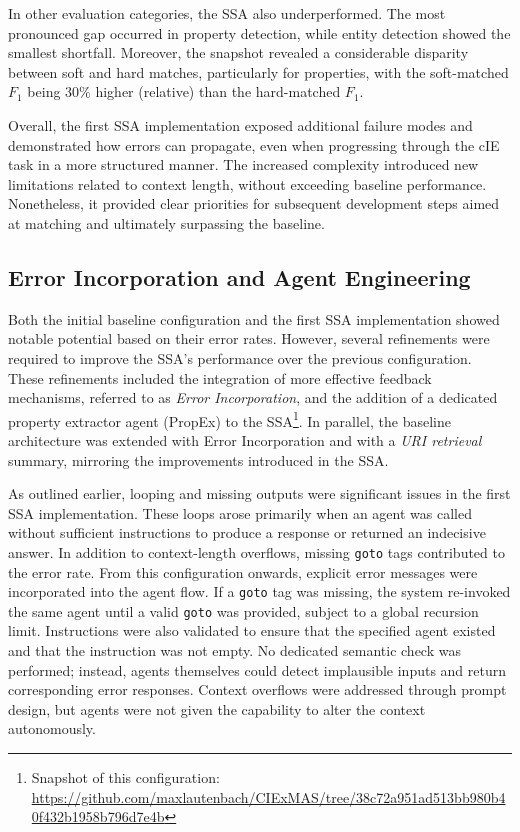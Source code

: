 \documentclass[a4paper,oneside,bibliography=totoc]{scrbook}
\begin{document}
In other evaluation categories, the \ac{SSA} also underperformed. The most pronounced gap occurred in property detection, while entity detection showed the smallest shortfall. Moreover, the snapshot revealed a considerable disparity between soft and hard matches, particularly for properties, with the soft-matched $F_{1}$ being \(30\%\) higher (relative) than the hard-matched $F_{1}$.

Overall, the first \ac{SSA} implementation exposed additional failure modes and demonstrated how errors can propagate, even when progressing through the \ac{cIE} task in a more structured manner. The increased complexity introduced new limitations related to context length, without exceeding baseline performance. Nonetheless, it provided clear priorities for subsequent development steps aimed at matching and ultimately surpassing the baseline.

\subsection{Error Incorporation and Agent Engineering}
\label{subsec:error_message_incorporation}

Both the initial baseline configuration and the first \ac{SSA} implementation showed notable potential based on their error rates. However, several refinements were required to improve the \ac{SSA}’s performance over the previous configuration. These refinements included the integration of more effective feedback mechanisms, referred to as \textit{Error Incorporation}, and the addition of a dedicated property extractor agent (\ac{PropEx}) to the \ac{SSA}\footnote{Snapshot of this configuration: \url{https://github.com/maxlautenbach/CIExMAS/tree/38c72a951ad513bb980b40f432b1958b796d7e4b}}. In parallel, the baseline architecture was extended with Error Incorporation and with a \textit{URI retrieval} summary, mirroring the improvements introduced in the \ac{SSA}.

As outlined earlier, looping and missing outputs were significant issues in the first \ac{SSA} implementation. These loops arose primarily when an agent was called without sufficient instructions to produce a response or returned an indecisive answer. In addition to context-length overflows, missing \texttt{goto} tags contributed to the error rate. From this configuration onwards, explicit error messages were incorporated into the agent flow. If a \texttt{goto} tag was missing, the system re-invoked the same agent until a valid \texttt{goto} was provided, subject to a global recursion limit. Instructions were also validated to ensure that the specified agent existed and that the instruction was not empty. No dedicated semantic check was performed; instead, agents themselves could detect implausible inputs and return corresponding error responses. Context overflows were addressed through prompt design, but agents were not given the capability to alter the context autonomously.
\end{document}
